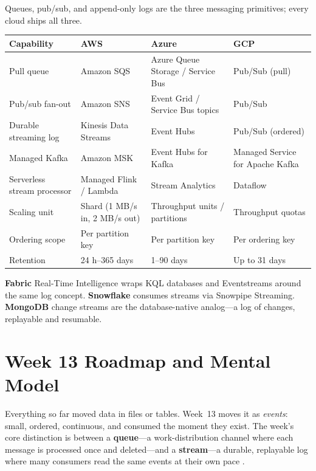 \begin{crosscloud}
Queues, pub/sub, and append-only logs are the three messaging primitives; every cloud ships all three.

\vspace{2mm}
{\footnotesize
\begin{tabular}{@{}p{2.8cm}p{3.0cm}p{3.0cm}p{3.0cm}@{}}
\toprule
\textbf{Capability} & \textbf{AWS} & \textbf{Azure} & \textbf{GCP} \\
\midrule
Pull queue & Amazon SQS & Azure Queue Storage / Service Bus & Pub/Sub (pull) \\
Pub/sub fan-out & Amazon SNS & Event Grid / Service Bus topics & Pub/Sub \\
Durable streaming log & Kinesis Data Streams & Event Hubs & Pub/Sub (ordered) \\
Managed Kafka & Amazon MSK & Event Hubs for Kafka & Managed Service for Apache Kafka \\
Serverless stream processor & Managed Flink / Lambda & Stream Analytics & Dataflow \\
\addlinespace
Scaling unit & Shard (1 MB/s in, 2 MB/s out) & Throughput units / partitions & Throughput quotas \\
Ordering scope & Per partition key & Per partition key & Per ordering key \\
Retention & 24 h--365 days & 1--90 days & Up to 31 days \\
\bottomrule
\end{tabular}}

\vspace{1mm}
\textbf{Fabric} Real-Time Intelligence wraps KQL databases and Eventstreams around the same log concept. \textbf{Snowflake} consumes streams via Snowpipe Streaming. \textbf{MongoDB} change streams are the database-native analog---a log of changes, replayable and resumable.
\end{crosscloud}

\section{Week 13 Roadmap and Mental Model}
Everything so far moved data in files or tables. Week~13 moves it as \emph{events}: small, ordered, continuous, and consumed the moment they exist. The week's core distinction is between a \textbf{queue}---a work-distribution channel where each message is processed once and deleted---and a \textbf{stream}---a durable, replayable log where many consumers read the same events at their own pace \cite{awsKinesisDocs}.


